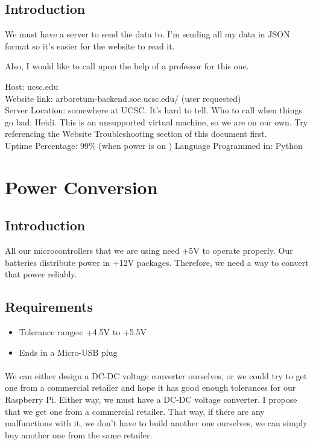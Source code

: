 \subsection{Introduction}

We must have a server to send the data to. I’m sending all my data in JSON format so it’s easier for the website to read it.


Also, I would like to call upon the help of a professor for this one.

Host: ucsc.edu \\
Website link: arboretum-backend.soe.ucsc.edu/ (user requested) \\
Server Location: somewhere at UCSC. It's hard to tell. 
Who to call when things go bad: Heidi. This is an unsupported virtual machine, so we are on our own. Try referencing the Website Troubleshooting section of this document first. \\
Uptime Percentage: 99\% (when power is on )
Language Programmed in: Python

\section{Power Conversion}

\subsection{Introduction}
All our microcontrollers that we are using need +5V to operate properly. Our batteries distribute power in +12V packages. Therefore, we need a way to convert that power reliably.
\subsection{Requirements}
\begin{itemize}
	\item Tolerance ranges: +4.5V to +5.5V
	\item Ends in a Micro-USB plug
\end{itemize}
\paragraph{}
We can either design a DC-DC voltage converter ourselves, or we could try to get one from a commercial retailer and hope it has good enough tolerances for our Raspberry Pi. Either way, we must have a DC-DC voltage converter.
I propose that we get one from a commercial retailer. That way, if there are any malfunctions with it, we don’t have to build another one ourselves, we can simply buy another one from the same retailer. 
\par

